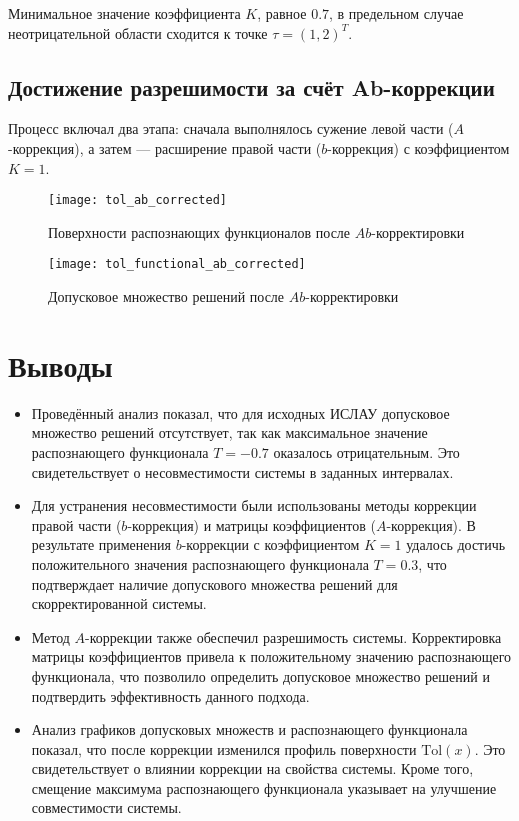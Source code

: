 \documentclass[a4paper,14pt]{article}
\begin{document}
Минимальное значение коэффициента \( K \), равное \( 0.7 \), в предельном случае неотрицательной области сходится к точке \( \tau = (1, 2)^T \).



\subsection{Достижение разрешимости за счёт Ab-коррекции}

Процесс включал два этапа: сначала выполнялось сужение левой части (\( A \)-коррекция), а затем — расширение правой части (\( b \)-коррекция) с коэффициентом \( K = 1 \).

\begin{figure}[H]
    \begin{center}
        \texttt{[image: tol\_ab\_corrected]}
        \caption{Поверхности распознающих функционалов после
    \( Ab \)-корректировки}
  \label{figure:tol_ab_corrected}
    \end{center}
\end{figure}

\begin{figure}[H]
    \begin{center}
        \texttt{[image: tol\_functional\_ab\_corrected]}
        \caption{Допусковое множество решений после \( Ab \)-корректировки}
  \label{figure:tol_functional_ab_corrected}
    \end{center}
\end{figure}


\section{Выводы}

\begin{itemize}
  \item Проведённый анализ показал, что для исходных ИСЛАУ допусковое множество решений отсутствует, так как максимальное значение распознающего функционала \( T = -0.7 \) оказалось отрицательным. Это свидетельствует о несовместимости системы в заданных интервалах.
  \item Для устранения несовместимости были использованы методы коррекции правой части (\( b \)-коррекция) и матрицы коэффициентов (\( A \)-коррекция). В результате применения \( b \)-коррекции с коэффициентом \( K = 1 \) удалось достичь положительного значения распознающего функционала \( T = 0.3 \), что подтверждает наличие допускового множества решений для скорректированной системы.
  \item Метод \( A \)-коррекции также обеспечил разрешимость системы. Корректировка матрицы коэффициентов привела к положительному значению распознающего функционала, что позволило определить допусковое множество решений и подтвердить эффективность данного подхода.
  \item Анализ графиков допусковых множеств и распознающего функционала показал, что после коррекции изменился профиль поверхности \( \text{Tol}(x) \). Это свидетельствует о влиянии коррекции на свойства системы. Кроме того, смещение максимума распознающего функционала указывает на улучшение совместимости системы.
\end{itemize}
\end{document}
